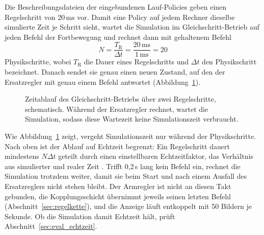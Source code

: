 Die Beschreibungsdateien der eingebundenen Lauf-Policies geben einen Regelschritt von 20\,ms vor.
Damit eine Policy auf jedem Rechner dieselbe simulierte Zeit je Schritt sieht, wartet die Simulation im Gleichschritt-Betrieb auf jeden Befehl der Fortbewegung und rechnet dann mit gehaltenem Befehl
\begin{equation}
  N = \frac{T_{\mathrm{R}}}{\Delta t} = \frac{20\,\mathrm{ms}}{1\,\mathrm{ms}} = 20
  \label{eq:physikschritte}
\end{equation}
%
Physikschritte, wobei $T_{\mathrm{R}}$ die Dauer eines Regelschritts und $\Delta t$ den Physikschritt bezeichnet.
Danach sendet sie genau einen neuen Zustand, auf den der Ersatzregler mit genau einem Befehl antwortet (Abbildung~\ref{fig:lockstep}).

\begin{figure}[htbp]
  \centering
  
  \caption[Zeitablauf des Gleichschritt-Betriebs]{Zeitablauf des Gleichschritt-Betriebs über zwei Regelschritte, schematisch. Während der Ersatzregler rechnet, wartet die Simulation, sodass diese Wartezeit keine Simulationszeit verbraucht.}
  \label{fig:lockstep}
\end{figure}

Wie Abbildung~\ref{fig:lockstep} zeigt, vergeht Simulationszeit nur während der Physikschritte.
Nach oben ist der Ablauf auf Echtzeit begrenzt: Ein Regelschritt dauert mindestens $N \Delta t$ geteilt durch einen einstellbaren Echtzeitfaktor, das Verhältnis aus simulierter und realer Zeit \cite{Pitonakova2018}.
Trifft 0,2\,s lang kein Befehl ein, rechnet die Simulation trotzdem weiter, damit sie beim Start und nach einem Ausfall des Ersatzreglers nicht stehen bleibt.
Der Armregler ist nicht an diesen Takt gebunden, die Kopplungsschicht übernimmt jeweils seinen letzten Befehl (Abschnitt~\ref{sec:regelkette}), und die Anzeige läuft entkoppelt mit 50 Bildern je Sekunde.
Ob die Simulation damit Echtzeit hält, prüft Abschnitt~\ref{sec:eval_echtzeit}.

